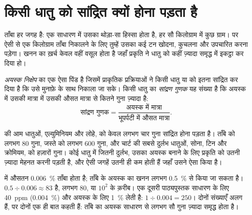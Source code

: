 \section{किसी धातु को सांद्रित क्यों होना पड़ता है}

ताँबा हर जगह है: एक साधारण  में उसका थोड़ा-सा हिस्सा होता है, हर सौ किलोग्राम में कुछ
ग्राम। पर ऐसी  से एक किलोग्राम ताँबा निकालने के लिए तुम्हें उसका कई टन खोदना, कुचलना
और उपचारित करना पड़ेगा। खनन का ख़र्च केवल वहीं वसूल होता है जहाँ प्रकृति ने धातु को कहीं
ज़्यादा समृद्ध  में इकट्ठा कर दिया हो।

\begin{definition}[अयस्क निक्षेप और सांद्रण गुणक]\label{def:g9:earth-resources:ore-deposit}
\emph{अयस्क निक्षेप}  का एक ऐसा पिंड है जिसमें प्राकृतिक
प्रक्रियाओं ने किसी धातु या  को इतना सांद्रित कर दिया है कि उसे मुनाफ़े के साथ निकाला
जा सके। किसी धातु का \emph{सांद्रण
गुणक} यह संख्या है कि अयस्क में उसकी मात्रा  में उसकी औसत
मात्रा से कितने गुना ज़्यादा है:
\[
\text{सांद्रण गुणक} = \frac{\text{अयस्क में मात्रा}}{\text{भूपर्पटी में औसत मात्रा}} .
\]
\end{definition}

 की आम धातुओं, एल्युमिनियम और लोहे, को केवल लगभग चार गुना सांद्रित होना पड़ता है।
ताँबे को लगभग 80 गुना, जस्ते को लगभग 600 गुना, और चार्ट की सबसे दुर्लभ धातुओं, सोना,
टिन और क्रोमियम, को हज़ारों गुना। कोई धातु  में जितनी दुर्लभ, उसका अयस्क बनाने के
लिए प्रकृति को उतनी ज़्यादा मेहनत करनी पड़ती है, और ऐसी जगहें उतनी ही कम होती हैं जहाँ उसने
ऐसा किया है।

\begin{example}[ताँबा]
 में औसतन \qty{0.006}{\%} ताँबा होता है; ताँबे के अयस्क का खनन लगभग
\qty{0.5}{\%} से किया जा सकता है।  $0.5 \div 0.006
\approx 83$ है, लगभग 80, या $10^2$ के क़रीब। एक दूसरी पाठ्यपुस्तक साधारण  के लिए \qty{40}{ppm}
(\qty{0.004}{\%}) और अयस्क के लिए \qty{1}{\%} लेती है: $1 \div
0.004 = 250$। दोनों
संख्याएँ अलग हैं, पर दोनों एक ही बात कहती हैं: ताँबे का अयस्क साधारण  से लगभग सौ
गुना ज़्यादा समृद्ध होता
है।
\end{example}

